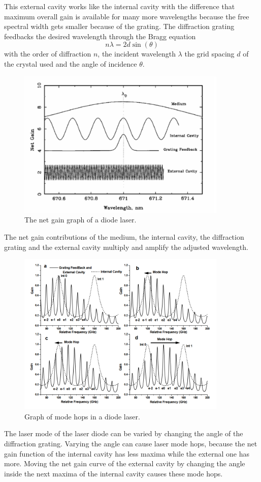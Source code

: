 This external cavity works like the internal cavity with the difference that maximum overall gain is available for many more wavelengths because the free spectral width gets smaller because of the grating. The diffraction grating feedbacks the desired wavelength through the Bragg equation
\begin{equation}
    n\lambda=2d\sin(\theta)
\end{equation}
with the order of diffraction $n$, the incident wavelength $\lambda$ the grid spacing $d$ of the crystal used and the angle of incidence $\theta$.\\
\begin{figure}[H]
    \centering
    \includegraphics[width=10cm]{content/net_gain.png}
    \caption{The net gain graph of a diode laser.}
\end{figure}
The net gain contributions of the medium, the internal cavity, the diffraction grating and the external cavity multiply and amplify the adjusted wavelength.\\
\begin{figure}[H]
    \centering
    \includegraphics[width=10cm]{content/mode_hop.png}
    \caption{Graph of mode hops in a diode laser.}
\end{figure}
The laser mode of the laser diode can be varied by changing the angle of the diffraction grating. Varying the angle can cause laser mode hops, because the net gain function of the internal cavity has less maxima while the external one has more. Moving the net gain curve of the external cavity by changing the angle inside the next maxima of the internal cavity causes these mode hops.
